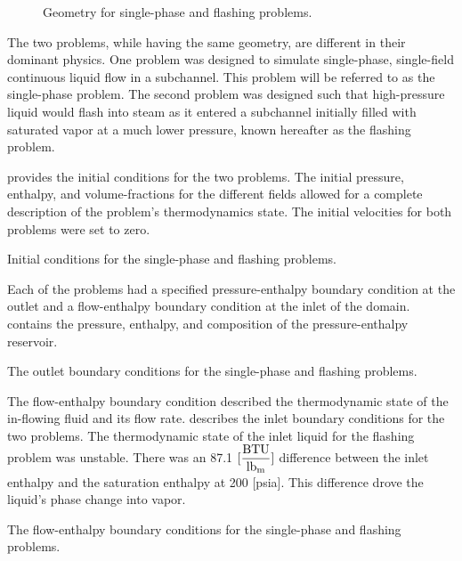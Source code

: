 \begin{figure}[h!tb]
\centering

\caption{Geometry for single-phase and flashing problems.}
\label{fig:exp_geometry}
\end{figure}

The two problems, while having the same geometry, are different in their dominant physics.
One problem was designed to simulate single-phase, single-field continuous liquid flow in a subchannel.
This problem will be referred to as the single-phase problem.
The second problem was designed such that high-pressure liquid would flash into steam as it entered a subchannel initially filled with saturated vapor at a much lower pressure, known hereafter as the flashing problem.

 provides the initial conditions for the two problems.
The initial pressure, enthalpy, and volume-fractions for the different fields allowed for a complete description of the problem's thermodynamics state.
The initial velocities for both problems were set to zero.

\begin{table}[h!tb]
\centering
\singlespace

\caption{Initial conditions for the single-phase and flashing problems.}
\label{tab:dualInitialConditions}
\end{table}

Each of the problems had a specified pressure-enthalpy boundary condition at the outlet and a flow-enthalpy boundary condition at the inlet of the domain.
 contains the pressure, enthalpy, and composition of the pressure-enthalpy reservoir. 

\begin{table}[h!tb]
\centering
\singlespace

\caption{The outlet boundary conditions for the single-phase and flashing problems.}
\label{tab:dualOutlet}
\end{table}

The flow-enthalpy boundary condition described the thermodynamic state of the in-flowing fluid and its flow rate.
 describes the inlet boundary conditions for the two problems.
The thermodynamic state of the inlet liquid for the flashing problem was unstable.
There was an 87.1 $\displaystyle [\frac{\text{BTU}}{\lbm{}}]$ difference between the inlet enthalpy and the saturation enthalpy at 200 [psia].
This difference drove the liquid's phase change into vapor.

\begin{table}[h!tb]
\centering
\singlespace

\caption{The flow-enthalpy boundary conditions for the single-phase and flashing problems.}
\label{tab:dualInlet}
\end{table}

